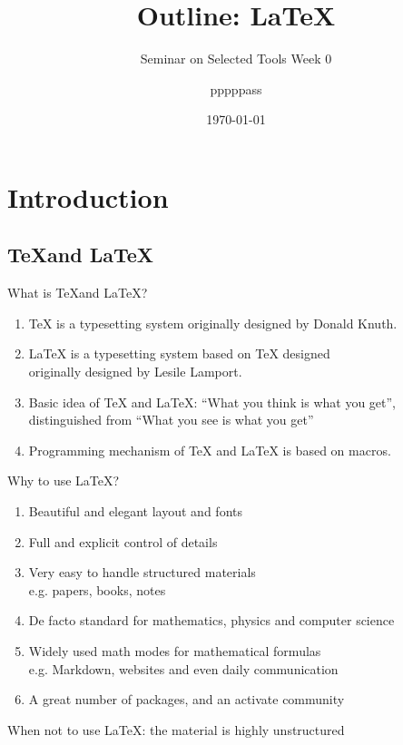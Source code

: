 \documentclass[english, nochinese]{pkuslide}
\title{Outline: \LaTeX}
\subtitle{Seminar on Selected Tools Week 0}
\author{pppppass}
\date{\today}
\begin{document}
\begin{frame}
\titlepage
\end{frame}

\begin{frame}
\tableofcontents[subsectionstyle=show]
\end{frame}

\section{Introduction}

\begin{frame}
\sectionpage
\end{frame}

\subsection{\TeX and \LaTeX}

\begin{frame}{What is \TeX and \LaTeX?}
\begin{enumerate}
\item \TeX{} is a typesetting system originally designed by Donald Knuth.
\item \LaTeX{} is a typesetting system based on \TeX{} designed \\
originally designed by Lesile Lamport.
\item Basic idea of \TeX{} and \LaTeX{}: ``What you think is what you get'', \\ distinguished from ``What you see is what you get''
\item Programming mechanism of \TeX{} and \LaTeX{} is based on macros.
\end{enumerate}
\end{frame}

\begin{frame}{Why to use \LaTeX?}
\begin{enumerate}
\item Beautiful and elegant layout and fonts
\item Full and explicit control of details
\item Very easy to handle structured materials \\
e.g. papers, books, notes
\item De facto standard for mathematics, physics and computer science
\item Widely used math modes for mathematical formulas \\
e.g. Markdown, websites and even daily communication
\item A great number of packages, and an activate community
\end{enumerate}

When not to use \LaTeX{}: the material is highly unstructured
\end{frame}
\end{document}
